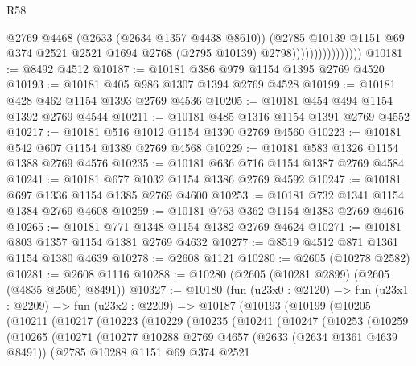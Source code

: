 \begin{lexlean}{R58}
\begin{coremodule}
                                  @2769
                                  @4468
                                  (@2633 (@2634 @1357 @4438 @8610))
                                  (@2785
                                    @10139
                                    @1151
                                    @69
                                    @374
                                    @2521
                                    @2521
                                    @1694
                                    @2768
                                    (@2795 @10139)
                                    @2798))))))))))))))))
@10181 := @8492 @4512
@10187 := @10181 @386 @979 @1154 @1395 @2769 @4520
@10193 := @10181 @405 @986 @1307 @1394 @2769 @4528
@10199 := @10181 @428 @462 @1154 @1393 @2769 @4536
@10205 := @10181 @454 @494 @1154 @1392 @2769 @4544
@10211 := @10181 @485 @1316 @1154 @1391 @2769 @4552
@10217 := @10181 @516 @1012 @1154 @1390 @2769 @4560
@10223 := @10181 @542 @607 @1154 @1389 @2769 @4568
@10229 := @10181 @583 @1326 @1154 @1388 @2769 @4576
@10235 := @10181 @636 @716 @1154 @1387 @2769 @4584
@10241 := @10181 @677 @1032 @1154 @1386 @2769 @4592
@10247 := @10181 @697 @1336 @1154 @1385 @2769 @4600
@10253 := @10181 @732 @1341 @1154 @1384 @2769 @4608
@10259 := @10181 @763 @362 @1154 @1383 @2769 @4616
@10265 := @10181 @771 @1348 @1154 @1382 @2769 @4624
@10271 := @10181 @803 @1357 @1154 @1381 @2769 @4632
@10277 := @8519 @4512 @871 @1361 @1154 @1380 @4639
@10278 := @2608 @1121
@10280 := @2605 (@10278 @2582)
@10281 := @2608 @1116
@10288 := @10280 (@2605 (@10281 @2899) (@2605 (@4835 @2505) @8491))
@10327 := @10180
    (fun (u23x0 : @2120) =>
    fun (u23x1 : @2209) =>
    fun (u23x2 : @2209) =>
    @10187
      (@10193
        (@10199
          (@10205
            (@10211
              (@10217
                (@10223
                  (@10229
                    (@10235
                      (@10241
                        (@10247
                          (@10253
                            (@10259
                              (@10265
                                (@10271
                                  (@10277
                                    @10288
                                    @2769
                                    @4657
                                    (@2633 (@2634 @1361 @4639 @8491))
                                    (@2785
                                      @10288
                                      @1151
                                      @69
                                      @374
                                      @2521

\end{coremodule}
\end{lexlean}
